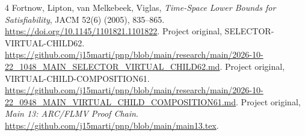 \documentclass[11pt]{article}
\begin{document}
\begin{thebibliography}{4}
 Fortnow, Lipton, van Melkebeek, Viglas, \emph{Time-Space Lower Bounds for Satisfiability}, JACM 52(6) (2005), 835--865. \url{https://doi.org/10.1145/1101821.1101822}.
 Project original, SELECTOR-VIRTUAL-CHILD62. \url{https://github.com/j15marti/pnp/blob/main/research/main/2026-10-22_1048_MAIN_SELECTOR_VIRTUAL_CHILD62.md}.
 Project original, VIRTUAL-CHILD-COMPOSITION61. \url{https://github.com/j15marti/pnp/blob/main/research/main/2026-10-22_0948_MAIN_VIRTUAL_CHILD_COMPOSITION61.md}.
 Project original, \emph{Main 13: ARC/FLMV Proof Chain}. \url{https://github.com/j15marti/pnp/blob/main/main13.tex}.
\end{thebibliography}
\end{document}
